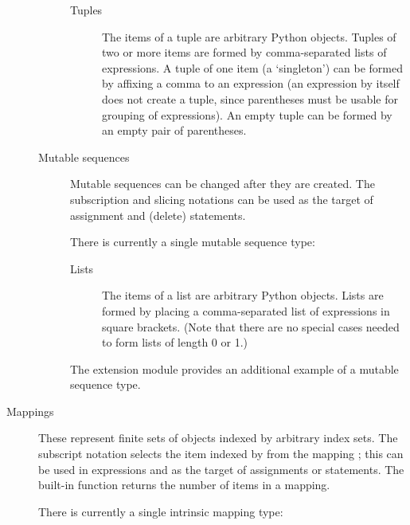 \begin{description}
\begin{description}
\begin{description}
\item[Tuples]
The items of a tuple are arbitrary Python objects.
Tuples of two or more items are formed by comma-separated lists
of expressions.  A tuple of one item (a `singleton') can be formed
by affixing a comma to an expression (an expression by itself does
not create a tuple, since parentheses must be usable for grouping of
expressions).  An empty tuple can be formed by an empty pair of
parentheses.

\end{description} %

\item[Mutable sequences]
Mutable sequences can be changed after they are created.  The
subscription and slicing notations can be used as the target of
assignment and  (delete) statements.

There is currently a single mutable sequence type:

\begin{description}

\item[Lists]
The items of a list are arbitrary Python objects.  Lists are formed
by placing a comma-separated list of expressions in square brackets.
(Note that there are no special cases needed to form lists of length 0
or 1.)

\end{description} %

The extension module  provides an
additional example of a mutable sequence type.


\end{description} %

\item[Mappings]
These represent finite sets of objects indexed by arbitrary index sets.
The subscript notation  selects the item indexed
by  from the mapping ; this can be used in
expressions and as the target of assignments or  statements.
The built-in function  returns the number of items
in a mapping.

There is currently a single intrinsic mapping type:

\begin{description}


\end{description}
\end{description}
